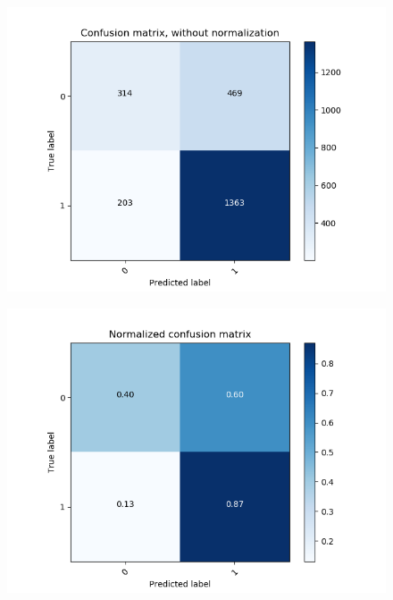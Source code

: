 \begin{figure}[H]
	\centering
	\begin{minipage}[b]{0.45\columnwidth}
	\centering
	\includegraphics[clip, width=\linewidth]{fig/chapter4/count_pretrain_False_he_False}
	\label{fig:count_no_preprocess}
    \end{minipage}
	\begin{minipage}[b]{0.45\columnwidth}
		\centering
		\includegraphics[clip, width=\linewidth]{fig/chapter4/pretrain_False_he_False}
		\label{fig:no_preprocess}
	\end{minipage}
	\begin{minipage}[b]{0.45\columnwidth}

\end{minipage}
\end{figure}
